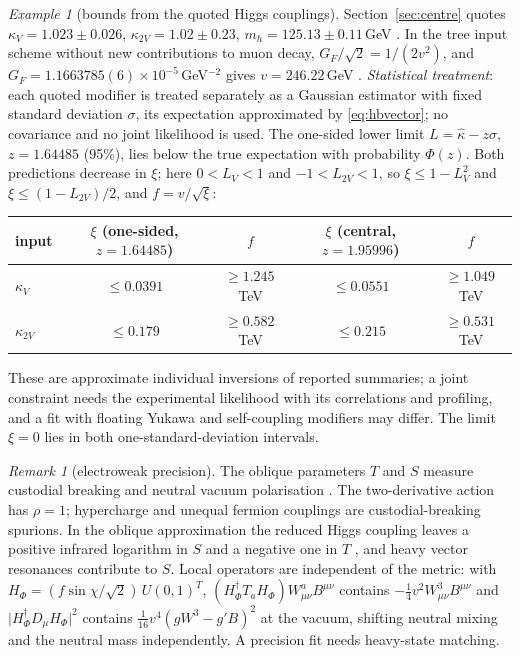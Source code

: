 \documentclass[aps,pra,onecolumn,superscriptaddress,nofootinbib,10pt]{revtex4-2}
\theoremstyle{definition}
\theoremstyle{remark}
\newtheorem{remark}[theorem]{Remark}
\newtheorem{example}[theorem]{Example}
\begin{document}
\begin{example}[bounds from the quoted Higgs couplings]\label{ex:hbdata}
Section~\ref{sec:centre} quotes $\kappa_V=1.023\pm0.026$, $\kappa_{2V}=1.02\pm0.23$, $m_h=125.13\pm0.11$\,GeV \cite{ex-PDG26}.  In the tree input
scheme without new contributions to muon decay, $G_F/\sqrt2=1/(2v^2)$, and $G_F=1.1663785(6)\times10^{-5}$\,GeV$^{-2}$ gives
$v=246.22$\,GeV \cite[Sec.~10.3.2 of the electroweak review]{ex-PDG26}.  \emph{Statistical treatment}: each quoted
modifier is treated separately as a Gaussian estimator with fixed standard deviation $\sigma$, its expectation
approximated by \eqref{eq:hbvector}; no covariance and no joint likelihood is used.  The one-sided lower limit
$L=\hat\kappa-z\sigma$, $z=1.64485$ (95\%), lies below the true expectation with probability $\Phi(z)$.  Both predictions
decrease in $\xi$; here $0<L_V<1$ and $-1<L_{2V}<1$, so $\xi\le1-L_V^2$ and $\xi\le(1-L_{2V})/2$, and $f=v/\sqrt\xi$:
\begin{center}\footnotesize
\begin{tabular}{@{}lcccc@{}}
\toprule
input & $\xi$ (one-sided, $z=1.64485$) & $f$ & $\xi$ (central, $z=1.95996$) & $f$\\
\midrule
$\kappa_V$ & $\le0.0391$ & $\ge1.245$\,TeV & $\le0.0551$ & $\ge1.049$\,TeV\\
$\kappa_{2V}$ & $\le0.179$ & $\ge0.582$\,TeV & $\le0.215$ & $\ge0.531$\,TeV\\
\bottomrule
\end{tabular}
\end{center}
These are approximate individual inversions of reported summaries; a joint constraint needs the
experimental likelihood with its correlations and profiling, and a fit with floating Yukawa and
self-coupling modifiers may differ.  The limit $\xi=0$ lies in both one-standard-deviation intervals.
\end{example}

\begin{remark}[electroweak precision]\label{rem:hbprecision}
The oblique parameters $T$ and $S$ \cite{n7:PT} measure custodial breaking and neutral vacuum polarisation
\cite[Sec.~10.6, Eq.~(10.84), Table~10.8 of the electroweak review]{ex-PDG26}.  The two-derivative action has $\rho=1$;
hypercharge and unequal fermion couplings are custodial-breaking spurions.  In the oblique
approximation the reduced Higgs coupling leaves a positive infrared logarithm in $S$ and a negative one in $T$
\cite{n7:BBRV,n7:PW}, and heavy vector resonances contribute to $S$.  Local operators are independent of the
metric: with $H_\Phi=(f\sin\chi/\sqrt2)\,U(0,1)^T$, $(H_\Phi^\dagger T_aH_\Phi)W^a_{\mu\nu}B^{\mu\nu}$ contains $-\tfrac14v^2W^3_{\mu\nu}B^{\mu\nu}$ and $\lvert H_\Phi^\dagger D_\mu H_\Phi\rvert^2$
contains $\tfrac1{16}v^4(gW^3-g'B)^2$ at the vacuum, shifting neutral mixing and the neutral mass independently.  A
precision fit needs heavy-state matching.
\end{remark}
\end{document}
